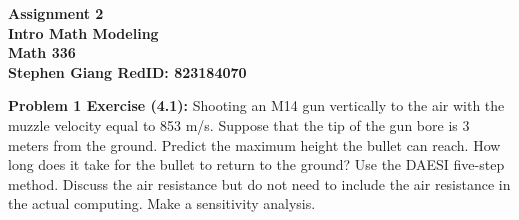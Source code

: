 \documentclass[11pt]{article}
\newcommand{\skipline}{\vspace{\baselineskip}}
\newenvironment{problem}[1]{\textbf{Problem #1: }}{\newpage}
\begin{document}
	
	\begin{center}
		\textbf{Assignment 2} \\
		\textbf{Intro Math Modeling} \\
		\textbf{Math 336} \\
		\textbf{Stephen Giang RedID: 823184070} \\
		\skipline \skipline
	\end{center}

	\begin{problem}{1 Exercise (4.1)}
		Shooting an M14 gun vertically to the air with the muzzle velocity equal to 853 m/s.
		Suppose that the tip of the gun bore is 3 meters from the ground. Predict the maximum
		height the bullet can reach. How long does it take for the bullet to return to the ground?
		Use the DAESI five-step method. Discuss the air resistance but do not need to include the
		air resistance in the actual computing. Make a sensitivity analysis.


\end{problem}
\end{document}
